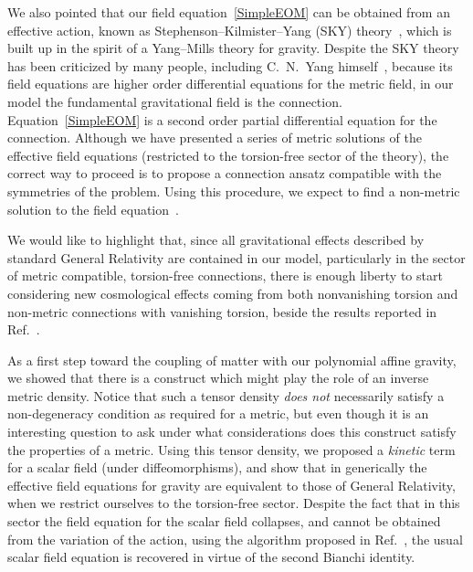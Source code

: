 \documentclass[aps,prd,12pt,twocolumn,superscriptaddress,showpacs,showkeys,reprint%
]{revtex4-1}
\renewcommand{\(}{\left(}
\renewcommand{\)}{\right)}
\renewcommand{\[}{\left[}
\renewcommand{\]}{\right]}
\begin{document}
We also pointed that our field equation~\eqref{SimpleEOM} can be obtained from an effective action, known as Stephenson--Kilmister--Yang (SKY) theory~\cite{stephenson1958quadratic,kilmister1961use,Yang1974}, which is built up in the spirit of a Yang--Mills theory for gravity. Despite the SKY theory has been criticized by many people, including C.~N.~Yang himself~\cite{JZcomm}, because its field equations are higher order differential equations for the metric field,
in our model the fundamental gravitational field is the connection. Equation~\eqref{SimpleEOM} is a second order partial differential equation for the connection. Although we have presented a series of metric solutions of the effective field equations (restricted to the torsion-free sector of the theory), the correct way to proceed is to propose a connection ansatz compatible with the symmetries of the problem. Using this procedure, we expect to find a non-metric solution to the field equation~\cite{OCF-future2}.

We would like to highlight that, since all gravitational effects described by standard General Relativity are contained in our model, particularly in the sector of metric compatible, torsion-free connections, there is enough liberty to start considering new cosmological effects coming from both nonvanishing torsion and non-metric connections with vanishing torsion, beside the results reported in Ref.~\cite{Chen:2013kia,Chen:2013ota}.

As a first step toward the coupling of matter with our polynomial affine gravity, we showed that there is a construct which might play the role of an inverse metric density. Notice that such a tensor density \emph{does not} necessarily satisfy a non-degeneracy condition as required for a metric, but even though it is an interesting question to ask under what considerations does this construct satisfy the properties of a metric. Using this tensor density, we proposed a \emph{kinetic} term for a scalar field (under diffeomorphisms), and show that in generically the effective field equations for gravity are equivalent to those of General Relativity, when we restrict ourselves to the torsion-free sector. Despite the fact that in this sector the field equation for the scalar field collapses, and cannot be obtained from the variation of the action, using the algorithm proposed in Ref.~\cite{Bekenstein:2014uwa}, the usual scalar field equation is recovered in virtue of the second Bianchi identity. 
\end{document}
